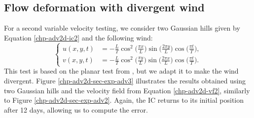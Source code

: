 \subsection{Flow deformation with divergent wind}
\label{2d-adv-divflow}
For a second variable velocity testing, we consider two Gaussian hills given by Equation 
\eqref{chp-adv2d-ic2} and the following wind:
\begin{equation}
	\label{chp-adv2d-vf2}
	\begin{cases}
		u(x,y,t) &= -\frac{L}{T} \cos^2\big(\frac{\pi x}{L}\big) \sin\big(\frac{2\pi y}{L}\big) \cos\big(\frac{\pi t}{T}\big), \\
		v(x,y,t) &= -\frac{L}{T} \cos^2\big(\frac{\pi y}{L}\big) \sin\big(\frac{2\pi x}{L}\big) \cos\big(\frac{\pi t}{T}\big).
	\end{cases}
\end{equation}
This test is based on the planar test from \citet{nair:2010}, but we adapt it to make the wind divergent.
Figure \ref{chp-adv2d-sec-exp-adv3} illustrates the results obtained using two Gaussian hills and the velocity field 
from Equation \eqref{chp-adv2d-vf2}, similarly to Figure  \ref{chp-adv2d-sec-exp-adv2}.
Again, the IC returns to its initial position after 12 days, allowing us to compute the error.

